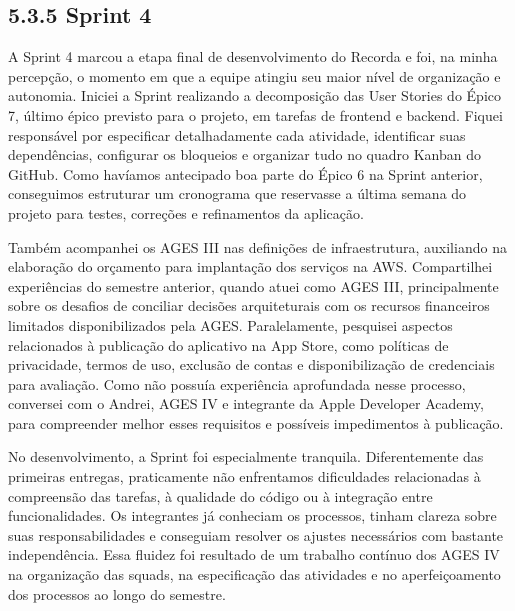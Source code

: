\hypertarget{__RefHeading___Toc4853_3118176633}{}
\subsection*{5.3.5 Sprint 4}
\label{ages-iv:text-h-0121}

\indent A Sprint 4 marcou a etapa final de desenvolvimento do Recorda e foi, na minha percepção, o momento em que a equipe atingiu seu maior nível de organização e autonomia. Iniciei a Sprint realizando a decomposição das User Stories do Épico 7, último épico previsto para o projeto, em tarefas de frontend e backend. Fiquei responsável por especificar detalhadamente cada atividade, identificar suas dependências, configurar os bloqueios e organizar tudo no quadro Kanban do GitHub. Como havíamos antecipado boa parte do Épico 6 na Sprint anterior, conseguimos estruturar um cronograma que reservasse a última semana do projeto para testes, correções e refinamentos da aplicação.\par

\indent Também acompanhei os AGES III nas definições de infraestrutura, auxiliando na elaboração do orçamento para implantação dos serviços na AWS. Compartilhei experiências do semestre anterior, quando atuei como AGES III, principalmente sobre os desafios de conciliar decisões arquiteturais com os recursos financeiros limitados disponibilizados pela AGES. Paralelamente, pesquisei aspectos relacionados à publicação do aplicativo na App Store, como políticas de privacidade, termos de uso, exclusão de contas e disponibilização de credenciais para avaliação. Como não possuía experiência aprofundada nesse processo, conversei com o Andrei, AGES IV e integrante da Apple Developer Academy, para compreender melhor esses requisitos e possíveis impedimentos à publicação.\par

\indent No desenvolvimento, a Sprint foi especialmente tranquila. Diferentemente das primeiras entregas, praticamente não enfrentamos dificuldades relacionadas à compreensão das tarefas, à qualidade do código ou à integração entre funcionalidades. Os integrantes já conheciam os processos, tinham clareza sobre suas responsabilidades e conseguiam resolver os ajustes necessários com bastante independência. Essa fluidez foi resultado de um trabalho contínuo dos AGES IV na organização das squads, na especificação das atividades e no aperfeiçoamento dos processos ao longo do semestre.\par

